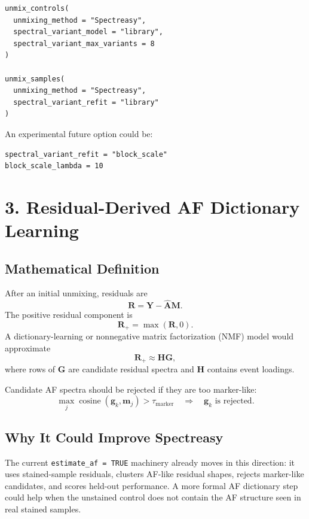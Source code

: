 \documentclass[11pt]{article}
\newcommand{\Y}{\mathbf{Y}}
\newcommand{\M}{\mathbf{M}}
\newcommand{\A}{\mathbf{A}}
\newcommand{\R}{\mathbf{R}}
\newcommand{\m}{\mathbf{m}}
\newcommand{\g}{\mathbf{g}}
\begin{document}
\begin{verbatim}
unmix_controls(
  unmixing_method = "Spectreasy",
  spectral_variant_model = "library",
  spectral_variant_max_variants = 8
)

unmix_samples(
  unmixing_method = "Spectreasy",
  spectral_variant_refit = "library"
)
\end{verbatim}

An experimental future option could be:
\begin{verbatim}
spectral_variant_refit = "block_scale"
block_scale_lambda = 10
\end{verbatim}

\section{3. Residual-Derived AF Dictionary Learning}

\subsection*{Mathematical Definition}

After an initial unmixing, residuals are
\begin{equation}
  \R = \Y - \hat{\A}\M.
\end{equation}
The positive residual component is
\begin{equation}
  \R_+ = \max(\R,0).
\end{equation}
A dictionary-learning or nonnegative matrix factorization (NMF) model would
approximate
\begin{equation}
  \R_+
  \approx
  \mathbf{H}\mathbf{G},
\end{equation}
where rows of \(\mathbf{G}\) are candidate residual spectra and
\(\mathbf{H}\) contains event loadings.

Candidate AF spectra should be rejected if they are too marker-like:
\begin{equation}
  \max_j
  \operatorname{cosine}(\g_k,\m_j)
  >
  \tau_{\text{marker}}
  \quad \Rightarrow \quad
  \g_k \text{ is rejected}.
\end{equation}

\subsection*{Why It Could Improve Spectreasy}

The current \texttt{estimate\_af = TRUE} machinery already moves in this direction: it
uses stained-sample residuals, clusters AF-like residual shapes, rejects
marker-like candidates, and scores held-out performance. A more formal AF
dictionary step could help when the unstained control does not contain the AF
structure seen in real stained samples.
\end{document}
